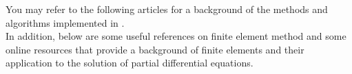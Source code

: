 You may refer to the following articles for a background of the methods and algorithms implemented in \biodeg. \\

% 

\noindent In addition, below are some useful references on finite element method and some online resources that provide a background of finite elements and their application to the solution of partial differential equations.\\



